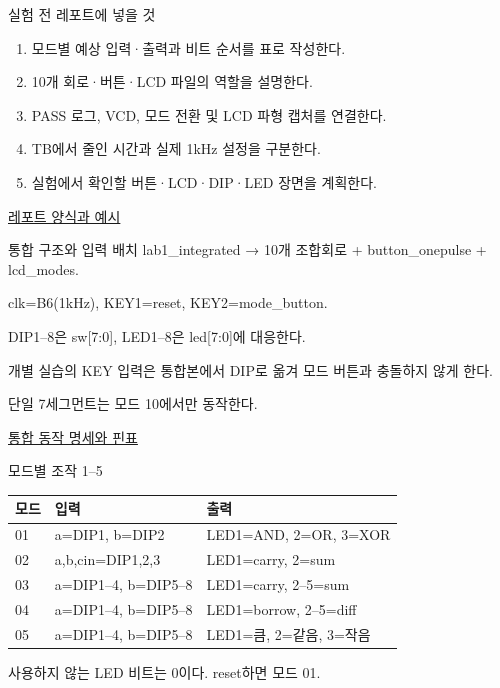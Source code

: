 \begin{frame}{실험 전 레포트에 넣을 것}\relax
\small
\begin{enumerate}\setlength{\itemsep}{0.22cm}
\item 모드별 예상 입력·출력과 비트 순서를 표로 작성한다.
\item 10개 회로·버튼·LCD 파일의 역할을 설명한다.
\item PASS 로그, VCD, 모드 전환 및 LCD 파형 캡처를 연결한다.
\item TB에서 줄인 시간과 실제 1kHz 설정을 구분한다.
\item 실험에서 확인할 버튼·LCD·DIP·LED 장면을 계획한다.
\end{enumerate}
\href{https://github.com/Glaysia/ece2_26_2_2/blob/daily/0910/example/fpga_projects_hdl/LAB1/docs/reports.md}{레포트 양식과 예시}
\end{frame}

\begin{frame}[label=integrated-cli-modes]{통합 구조와 입력 배치}\relax
\small
lab1\_integrated → 10개 조합회로 + button\_onepulse + lcd\_modes.\par\vspace{0.22cm}clk=B6(1kHz), KEY1=reset, KEY2=mode\_button.\par\vspace{0.22cm}DIP1–8은 sw[7:0], LED1–8은 led[7:0]에 대응한다.\par\vspace{0.22cm}개별 실습의 KEY 입력은 통합본에서 DIP로 옮겨 모드 버튼과 충돌하지 않게 한다.\par\vspace{0.22cm}단일 7세그먼트는 모드 10에서만 동작한다.\par\href{https://github.com/Glaysia/ece2_26_2_2/blob/daily/0910/example/fpga_projects_hdl/LAB1/docs/integrated.md}{통합 동작 명세와 핀표}
\end{frame}

\begin{frame}{모드별 조작 1–5}\relax
\small
\begin{center}\renewcommand{\arraystretch}{1.45}
\begin{tabular}{l|l|l}
모드 & 입력 & 출력\\\hline
01 & a=DIP1, b=DIP2 & LED1=AND, 2=OR, 3=XOR\\
02 & a,b,cin=DIP1,2,3 & LED1=carry, 2=sum\\
03 & a=DIP1–4, b=DIP5–8 & LED1=carry, 2–5=sum\\
04 & a=DIP1–4, b=DIP5–8 & LED1=borrow, 2–5=diff\\
05 & a=DIP1–4, b=DIP5–8 & LED1=큼, 2=같음, 3=작음\\
\end{tabular}\end{center}
사용하지 않는 LED 비트는 0이다. reset하면 모드 01.\par
\end{frame}

